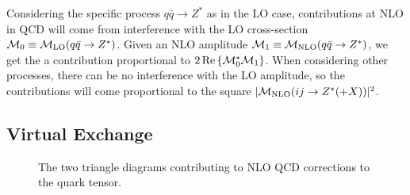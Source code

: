 \documentclass[../main.tex]{subfiles}
\begin{document}
Considering the specific process \(q\bar{q} \to Z^\ast\) as in the LO case, contributions at NLO in QCD will come from interference with the LO cross-section \(\mathcal{M}_0 \equiv \mathcal{M}_{\text{LO}}(q\bar{q} \to Z^\ast)\).
Given an NLO amplitude \(\mathcal{M}_1 \equiv \mathcal{M}_{\text{NLO}}(q\bar{q} \to Z^\ast)\), we get the a contribution proportional to \(2\operatorname{Re}\left\{\mathcal{M}_0^\ast \mathcal{M}_1\right\}\).
When considering other processes, there can be no interference with the LO amplitude, so the contributions will come proportional to the square \(|\mathcal{M}_{\text{NLO}}(ij \to Z^\ast( + X))|^2\).


\subsection{Virtual Exchange}

\begin{figure}[ht!]
  \centering
  \begin{subfigure}{.49\textwidth}
    \centering
    \caption{}
    \label{pc:subfig:gluon_triangle}
  \end{subfigure}
  \begin{subfigure}{.49\textwidth}
    \centering
    \caption{}
    \label{pc:subfig:gluino_triangle}
  \end{subfigure}
  \caption{The two triangle diagrams contributing to NLO QCD corrections to the quark tensor.}
  \label{pc:fig:NLO_triangles}
\end{figure}
\end{document}
